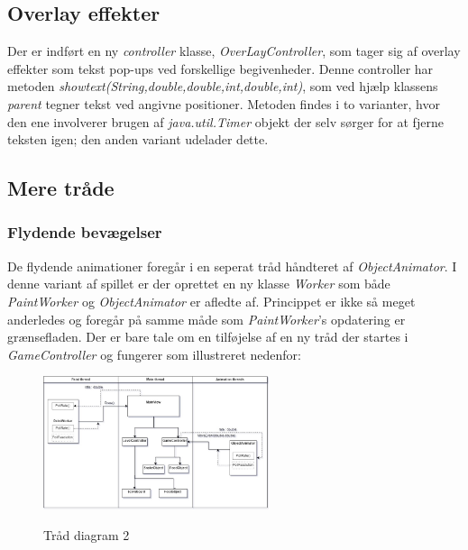 \documentclass[]{article}
\begin{document}
	\subsection{Overlay effekter}
	
	Der er indført en ny \textit{controller} klasse, \textit{OverLayController}, som tager sig af overlay effekter som tekst pop-ups ved forskellige begivenheder. Denne controller har metoden \textit{showtext(String,double,double,int,double,int)}, som ved hjælp klassens \textit{parent} tegner tekst ved angivne positioner. Metoden findes i to varianter, hvor den ene involverer brugen af \textit{java.util.Timer} objekt der selv sørger for at fjerne teksten igen; den anden variant udelader dette.
	
	\subsection{Mere tråde}
	\subsubsection{Flydende bevægelser}
	
	De flydende animationer foregår i en seperat tråd håndteret af \textit{ObjectAnimator}. I denne variant af spillet er der oprettet en ny klasse \textit{Worker} som både \textit{PaintWorker} og \textit{ObjectAnimator} er afledte af. Princippet er ikke så meget anderledes og foregår på samme måde som \textit{PaintWorker}'s opdatering er grænsefladen. Der er bare tale om en tilføjelse af en ny tråd der startes i \textit{GameController} og fungerer som illustreret nedenfor:
	
	\begin{figure}[h!]
		\centering
		\includegraphics[width=250px]{Thread_diagram_2.jpg}
		\label{fig:thread2}
		\caption{Tråd diagram 2}
	\end{figure}
	
\end{document}
